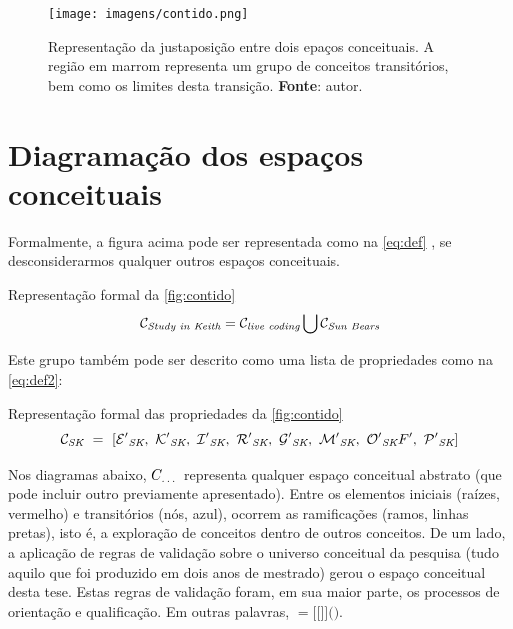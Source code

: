\begin{figure}[!h]
  \centering
  \texttt{[image: imagens/contido.png]}
  \caption{Representação da justaposição  entre dois epaços conceituais. A região em marrom representa um grupo de conceitos transitórios, bem como os limites desta transição. \textbf{Fonte}: autor. }
  \label{fig:contido}
\end{figure}

\section{Diagramação dos espaços conceituais}\label{sec:diagrama}

\newcommand{\csfeq}[2]{
\mathcal{#1}_\emph{#2}
}

\newcommand{\unionspaces}[6]{
\csfeq{#1}{#2} = \csfeq{#3}{#4} \bigcup \csfeq{#5}{#6}
}

\newcommand{\listspaces}[9]{
\csfeq{#1}{#2}~=~[\csfeq{#3}{#2},~\csfeq{#4}{#2},~\csfeq{#5}{#2},~\csfeq{#6}{#2},~\csfeq{#7}{#2},~\csfeq{#8}{#2},~\csfeq{#9}{#2}
}

Formalmente, a figura acima pode ser representada como na \autoref{eq:def} , se desconsiderarmos qualquer outros espaços conceituais.

\begin{example}{Representação formal da \autoref{fig:contido}}
\begin{equation}
\unionspaces{C}{Study in Keith}{C}{live coding}{C}{Sun Bears}
\label{eq:def}
\end{equation}
\end{example}

Este grupo também pode ser descrito como uma lista de propriedades como na \autoref{eq:def2}:

\begin{example}{Representação formal das propriedades da \autoref{fig:contido}}
\begin{equation}
\listspaces{C}{SK}{E'}{K'}{I'}{R'}{G'}{M'}{O'}{F'},~\csfeq{P'}{SK}]
\label{eq:def}
\end{equation}
\end{example}
  
Nos diagramas abaixo, $C_\emph{\ldots}$ representa qualquer espaço conceitual abstrato (que pode incluir outro previamente apresentado). Entre os elementos iniciais (raízes, vermelho) e transitórios (nós, azul), ocorrem as ramificações (ramos, linhas pretas), isto é, a exploração de conceitos dentro de outros conceitos. De um lado, a aplicação de regras de validação sobre o universo conceitual da pesquisa (tudo aquilo que foi produzido em dois anos de mestrado) gerou o espaço conceitual desta tese. Estas regras de validação foram, em sua maior parte, os processos de orientação e qualificação. Em outras palavras, $=[[$$]]($$)$.

